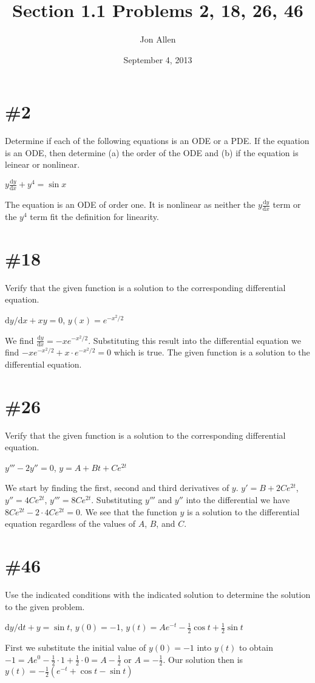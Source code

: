 \documentclass{article}
\begin{document}
\title{Section 1.1 Problems 2, 18, 26, 46}
\author{Jon Allen}
\date{September 4, 2013}
\maketitle
\section*{\#2}
Determine if each of the following equations is an ODE or a PDE. If the equation is an ODE, then determine (a) the order of the ODE and (b) if the equation is leinear or nonlinear.

$y\frac{\mathrm{d}y}{\mathrm{d}x}+y^4=\sin x$

The equation is an ODE of order one. It is nonlinear as neither the $y\frac{\mathrm{d}y}{\mathrm{d}x}$ term or the $y^4$ term fit the definition for linearity.
\section*{\#18}
Verify that the given function is a solution to the corresponding differential equation.

$\mathrm{d}y/\mathrm{d}x+xy=0$, $y(x)=e^{-x^2/2}$

We find $\frac{\mathrm{d}y}{\mathrm{d}x}=-xe^{-x^2/2}$. Substituting this result into the differential equation we find $-xe^{-x^2/2}+x\cdot e^{-x^2/2}=0$ which is true. The given function is a solution to the differential equation.
\section*{\#26}
Verify that the given function is a solution to the corresponding differential equation.

$y'''-2y''=0$, $y=A+Bt+Ce^{2t}$

We start by finding the first, second and third derivatives of $y$. $y'=B+2Ce^{2t}$, $y''=4Ce^{2t}$, $y'''=8Ce^{2t}$. Substituting $y'''$ and $y''$ into the differential we have $8Ce^{2t}-2\cdot4Ce^{2t}=0$. We see that the function $y$ is a solution to the differential equation regardless of the values of $A$, $B$, and $C$.
\section*{\#46}
Use the indicated conditions with the indicated solution to determine the solution to the given problem.

$\mathrm{d}y/\mathrm{d}t+y=\sin t$, $y(0)=-1$, $y(t)=Ae^{-t}-\frac{1}{2}\cos t+\frac{1}{2}\sin t$

First we substitute the initial value of $y(0)=-1$ into $y(t)$ to obtain $-1=Ae^0-\frac{1}{2}\cdot1+\frac{1}{2}\cdot0=A-\frac{1}{2}$ or $A=-\frac{1}{2}$. Our solution then is $y(t)=-\frac{1}{2}\left(e^{-t}+\cos t-\sin t\right)$
\end{document}

